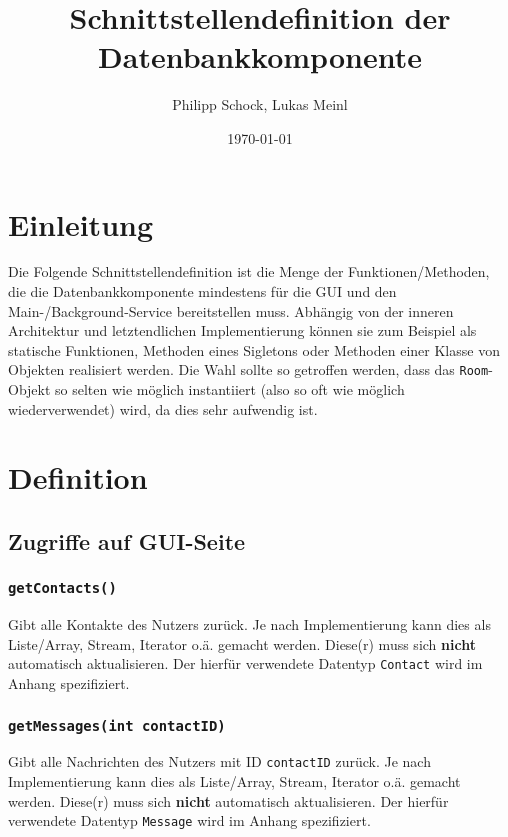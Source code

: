 \documentclass[a4paper]{article}
\title{Schnittstellendefinition der Datenbankkomponente}
\author{Philipp Schock, Lukas Meinl}
\date{\today}
\begin{document}
    \maketitle

    \section{Einleitung}

    Die Folgende Schnittstellendefinition ist die Menge der Funktionen/Methoden, die die Datenbankkomponente
    mindestens für die GUI und den Main-/Background-Service bereitstellen muss.
    Abhängig von der inneren Architektur und letztendlichen Implementierung können sie zum Beispiel als statische Funktionen,
    Methoden eines Sigletons oder Methoden einer Klasse von Objekten realisiert werden.
    Die Wahl sollte so getroffen werden, dass das \texttt{Room}-Objekt so selten wie möglich instantiiert
    (also so oft wie möglich wiederverwendet) wird, da dies sehr aufwendig ist.

    \section{Definition}

    \subsection{Zugriffe auf GUI-Seite}

    \subsubsection{\texttt{getContacts()}}
    Gibt alle Kontakte des Nutzers zurück.
    Je nach Implementierung kann dies als Liste/Array, Stream, Iterator o.ä. gemacht werden.
    Diese(r) muss sich \textbf{nicht} automatisch aktualisieren.
    Der hierfür verwendete Datentyp \texttt{Contact} wird im Anhang spezifiziert.

    \subsubsection{\texttt{getMessages(int contactID)}}
    Gibt alle Nachrichten des Nutzers mit ID \texttt{contactID} zurück.
    Je nach Implementierung kann dies als Liste/Array, Stream, Iterator o.ä. gemacht werden.
    Diese(r) muss sich \textbf{nicht} automatisch aktualisieren.
    Der hierfür verwendete Datentyp \texttt{Message} wird im Anhang spezifiziert.
\end{document}
